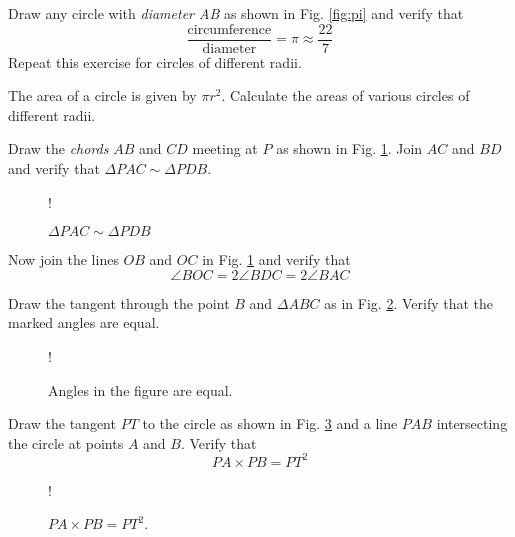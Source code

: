 \documentclass[journal,12pt,twocolumn]{IEEEtran}
\begin{document}
\begin{problem}
Draw any circle with {\em diameter AB} as shown in Fig. \ref{fig:pi} and verify that
\begin{equation}
\frac{\text{circumference}}{\text{diameter}} = \pi \approx \frac{22}{7}
\end{equation}
%
Repeat this exercise for circles of different radii.
\end{problem}
%
\begin{problem}
The area of a circle is given by $\pi r^2$.  Calculate the areas of various circles of different radii.
\end{problem}
%
\begin{problem}
Draw the {\em chords} $AB$ and $CD$ meeting at $P$ as shown in Fig. \ref{fig:circle_ratio}.  Join $AC$ and $BD$ and verify that $\Delta PAC \sim \Delta PDB$.
\end{problem}
%
\begin{figure}[!h]
\centering
\resizebox {\columnwidth} {!} {

}
\caption{$\Delta PAC \sim \Delta PDB$}
\label{fig:circle_ratio}
\end{figure}
%
\begin{problem}
Now join the lines $OB$ and $OC$ in Fig. \ref{fig:circle_ratio}  and verify that
\begin{equation}
\angle BOC = 2 \angle BDC = 2\angle BAC
\end{equation}
\end{problem}
%
%
\begin{problem}
Draw the tangent through the point $B$ and $\Delta ABC$ as in Fig. \ref{fig:tangent_angle}.  Verify that the marked angles are equal.
\end{problem}
%
\begin{figure}[!h]
\centering
\resizebox {\columnwidth} {!} {

}
\caption{Angles in the figure are equal.}
\label{fig:tangent_angle}
\end{figure}
%
%
\begin{problem}
Draw the tangent $PT$ to the circle as shown in  Fig. \ref{fig:tangent_intercept} and a line $PAB$ intersecting the circle at points $A$ and $B$.  Verify that
\begin{equation}
PA\times PB = PT^2
\end{equation}
\end{problem}
%
\begin{figure}[!h]
\centering
\resizebox {\columnwidth} {!} {

}
\caption{$PA\times PB = PT^2$.}
\label{fig:tangent_intercept}
\end{figure}
\end{document}
